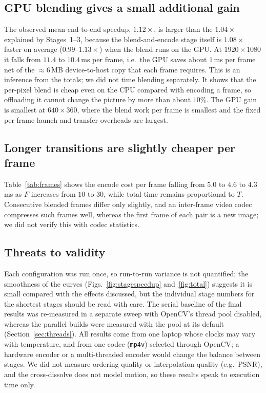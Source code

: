 \documentclass[conference]{IEEEtran}
\begin{document}
\subsection{GPU blending gives a small additional gain}
The observed mean end-to-end speedup, $1.12\times$, is larger than the $1.04\times$ explained by Stages~1--3, because the blend-and-encode stage itself is $1.08\times$ faster on average ($0.99$--$1.13\times$) when the blend runs on the GPU. At $1920\times1080$ it falls from $11.4$ to $10.4$\,ms per frame, i.e.\ the GPU saves about $1$\,ms per frame net of the $\approx 6$\,MB device-to-host copy that each frame requires. This is an inference from the totals; we did not time blending separately. It shows that the per-pixel blend is cheap even on the CPU compared with encoding a frame, so offloading it cannot change the picture by more than about $10\%$. The GPU gain is smallest at $640\times360$, where the blend work per frame is smallest and the fixed per-frame launch and transfer overheads are largest.

\subsection{Longer transitions are slightly cheaper per frame}
Table~\ref{tab:frames} shows the encode cost per frame falling from $5.0$ to $4.6$ to $4.3$\,ms as $F$ increases from $10$ to $30$, while total time remains proportional to $T$. Consecutive blended frames differ only slightly, and an inter-frame video codec compresses such frames well, whereas the first frame of each pair is a new image; we did not verify this with codec statistics.

\subsection{Threats to validity}
Each configuration was run once, so run-to-run variance is not quantified; the smoothness of the curves (Figs.~\ref{fig:stagespeedup} and~\ref{fig:total}) suggests it is small compared with the effects discussed, but the individual stage numbers for the shortest stages should be read with care. The serial baseline of the final results was re-measured in a separate sweep with OpenCV's thread pool disabled, whereas the parallel builds were measured with the pool at its default (Section~\ref{sec:threads}). All results come from one laptop whose clocks may vary with temperature, and from one codec (\texttt{mp4v}) selected through OpenCV; a hardware encoder or a multi-threaded encoder would change the balance between stages. We did not measure ordering quality or interpolation quality (e.g.\ PSNR), and the cross-dissolve does not model motion, so these results speak to execution time only.
\end{document}
